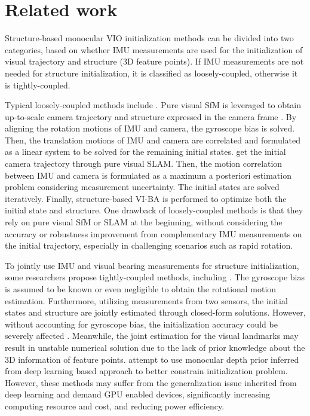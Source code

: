 \section{Related work}
Structure-based monocular VIO initialization methods can be divided into two categories, based on whether IMU measurements are used for the initialization of visual trajectory and structure (3D feature points). If IMU measurements are not needed for structure initialization, it is classified as loosely-coupled, otherwise it is tightly-coupled.

Typical loosely-coupled methods include \cite{qin2017robust, qin2018vins, campos2020inertial, campos2021orb}. Pure visual SfM is leveraged to obtain up-to-scale camera trajectory and structure expressed in the camera frame \cite{qin2017robust, qin2018vins}. By aligning the rotation motions of IMU and camera, the gyroscope bias is solved. Then, the translation motions of IMU and camera are correlated and formulated as a linear system to be solved for the remaining initial states. \cite{campos2020inertial, campos2021orb} get the initial camera trajectory through pure visual SLAM. Then, the motion correlation between IMU and camera is formulated as a maximum a posteriori estimation problem considering measurement uncertainty. The initial states are solved iteratively. Finally, structure-based VI-BA is performed to optimize both the initial state and structure. One drawback of loosely-coupled methods is that they rely on pure visual SfM or SLAM at the beginning, without considering the accuracy or robustness improvement from complementary IMU measurements on the initial trajectory, especially in challenging scenarios such as rapid rotation.

To jointly use IMU and visual bearing measurements for structure initialization, some researchers propose tightly-coupled methods, including \cite{martinelli2014closed, evangelidis2021revisiting, dong2012estimator, geneva2022openvins}. The gyroscope bias is assumed to be known or even negligible to obtain the rotational motion estimation. Furthermore, utilizing measurements from two sensors, the initial states and structure are jointly estimated through closed-form solutions. However, without accounting for gyroscope bias, the initialization accuracy could be severely affected \cite{kaiser2016simultaneous}. Meanwhile, the joint estimation for the visual landmarks may result in unstable numerical solution due to the lack of prior knowledge about the 3D information of feature points. \cite{zhou2022learned, merrill2023fast, merrill2024fast} attempt to use monocular depth prior inferred from deep learning based approach to better constrain initialization problem. However, these methods may suffer from the generalization issue inherited from deep learning and demand GPU enabled devices, significantly increasing computing resource and cost, and reducing power efficiency.

